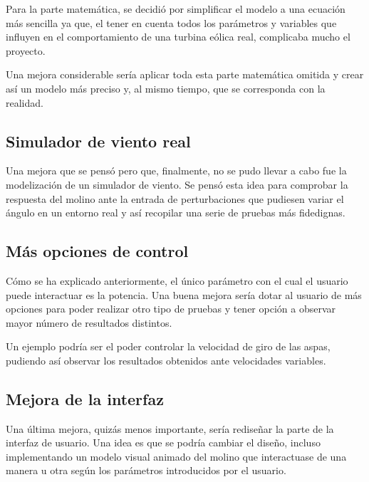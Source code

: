 Para la parte matemática, se decidió por simplificar el modelo a una ecuación más sencilla ya que, el tener en cuenta todos los parámetros y variables que influyen en el comportamiento de una turbina eólica real, complicaba mucho el proyecto.

Una mejora considerable sería aplicar toda esta parte matemática omitida y crear así un modelo más preciso y, al mismo tiempo, que se corresponda con la realidad.

\subsection{Simulador de viento real}

Una mejora que se pensó pero que, finalmente, no se pudo llevar a cabo fue la modelización de un simulador de viento.
Se pensó esta idea para comprobar la respuesta del molino ante la entrada de perturbaciones que pudiesen variar el ángulo en un entorno real y así recopilar una serie de pruebas más fidedignas.

\subsection{Más opciones de control}

Cómo se ha explicado anteriormente, el único parámetro con el cual el usuario puede interactuar es la potencia. Una buena mejora sería dotar al usuario de más opciones para poder realizar otro tipo de pruebas y tener opción a observar mayor número de resultados distintos.

Un ejemplo podría ser el poder controlar la velocidad de giro de las aspas, pudiendo así observar los resultados obtenidos ante velocidades variables.

\subsection{Mejora de la interfaz}

Una última mejora, quizás menos importante, sería rediseñar la parte de la interfaz de usuario.
Una idea es que se podría cambiar el diseño, incluso implementando un modelo visual animado del molino que interactuase de una manera u otra según los parámetros introducidos por el usuario.